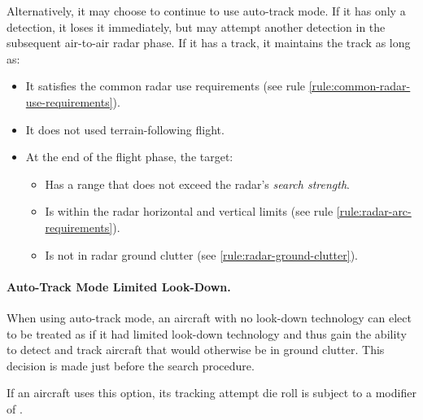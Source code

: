 {\begin{advancedrules}
Alternatively, it may choose to continue to use auto-track mode. If it has only a detection, it loses it immediately, but may attempt another detection in the subsequent air-to-air radar phase. If it has a track, it maintains the track as long as:
\begin{itemize}
    \item It satisfies the common radar use requirements (see rule \ref{rule:common-radar-use-requirements}).
    \item It does not used terrain-following flight.
    \item At the end of the flight phase, the target:
    \begin{itemize}
        \item Has a range that does not exceed the radar's \emph{search strength}.
        \item Is within the radar horizontal and vertical limits (see rule \ref{rule:radar-arc-requirements}).
        \item Is not in radar ground clutter (see  \ref{rule:radar-ground-clutter}).
    \end{itemize}
\end{itemize}


\paragraph{Auto-Track Mode Limited Look-Down.}

When using auto-track mode, an aircraft with no look-down technology can elect to be treated as if it had limited look-down technology and thus gain the ability to detect and track aircraft that would otherwise be in ground clutter. This decision is made just before the search procedure. 

If an aircraft uses this option, its tracking attempt die roll is subject to a modifier of . 


\end{advancedrules}}
